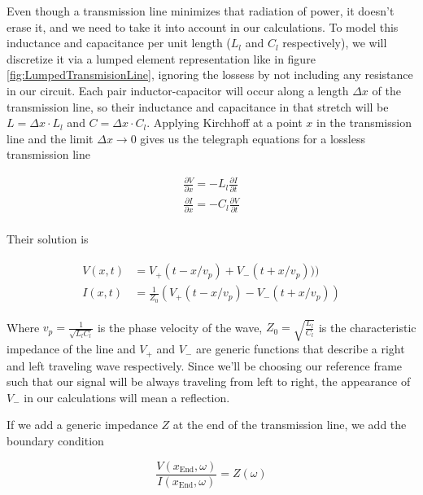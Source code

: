 \documentclass[../main.tex]{subfiles}
\begin{document}
Even though a transmission line minimizes that radiation of power, it doesn't
erase it, and we need to take it into account in our calculations. To model this
inductance and capacitance per unit length (\(L_{l}\) and \(C_{l}\) respectively),
we will discretize it via a lumped element representation like in figure
\ref{fig:LumpedTransmisionLine}, ignoring the lossess by not including any
resistance  in our circuit.
Each pair inductor-capacitor will occur along a length \(\Delta x\) of the
transmission line, so their inductance and capacitance in that stretch will be
\(L = \Delta x \cdot L_{l}\) and \(C = \Delta x \cdot C_{l}\). Applying Kirchhoff
at a point \(x\) in the transmission line and the limit \(\Delta x \to 0\) gives
us the telegraph equations for a lossless transmission line

\begin{equation}
\begin{split}
\label{eq:TelegraphEq}
    \frac{\partial V}{\partial x} = - L_{l}\frac{\partial I}{\partial t}\\
    \frac{\partial I}{\partial x} = - C_{l}\frac{\partial V}{\partial t}\\
\end{split}
\end{equation}

Their solution is

\begin{align}
\begin{split}
    \label{eq:TelegraphSol}
    V(x,t) &= V_{+}(t - x/v_{p}) + V_{-}(t + x/v_{p})))\\
    I(x,t) &= \frac{1}{Z_{0}}(V_{+}(t - x/v_{p}) - V_{-}(t + x/v_{p}))
\end{split}
\end{align}

Where \(v_{p} = \frac{1}{\sqrt{L_{l}C_{l}}}\) is the phase velocity of the wave,
\(Z_{0} = \sqrt{\frac{L_{l}}{C_{l}}}\) is the characteristic impedance of the
line and \(V_{+}\) and \(V_{-}\) are generic functions that describe a right
and left traveling wave respectively. Since we'll be choosing our reference
frame such that our signal will be always traveling from left to right, the
appearance of \(V_{-}\) in our calculations will mean a reflection.

If we add a generic impedance \(Z\) at the end of the transmission line, we
add the boundary condition

\begin{equation}
\label{eq:RfBoundCond}
    \frac{V(x_{\text{End}},\omega)}{I(x_{\text{End}},\omega)} = Z(\omega)
\end{equation}
\end{document}
